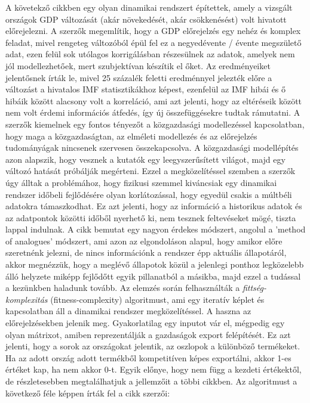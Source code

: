 \documentclass{article}
\theoremstyle{definition}
\theoremstyle{theorem}
\begin{document}
\newline A követekző cikkben \cite{Tacchella} egy olyan dinamikai rendszert építettek, amely a vizsgált országok GDP változását (akár növekedését, akár csökkenésést) volt hivatott előrejelezni. A szerzők megemlítik, hogy a GDP előrejelzés egy nehéz és komplex feladat, mivel rengeteg változóból épül fel ez a negyedévente / évente megszülető adat, ezen felül sok utólagos korrigálásban részesülnek az adatok, amelyek nem jól modellezhetőek, mert szubjektívan készítik el őket. Az eredményeiket jelentősnek írták le, mivel 25 százalék feletti eredménnyel jelezték előre a változást a hivatalos IMF statisztikákhoz képest, ezenfelül az IMF hibái és ő hibáik között alacsony volt a korreláció, ami azt jelenti, hogy az eltéréseik között nem volt érdemi információs átfedés, így új összefüggésekre tudtak rámutatni. A szerzők kiemelnek egy fontos tényezőt a közgazdasági modellezéssel kapcsolatban, hogy maga a közgazdaságtan, az elméleti modellezés és az előrejelzés tudományágak nincsenek szervesen összekapcsolva. A közgazdasági modellépítés azon alapszik, hogy vesznek a kutatók egy leegyszerűsített világot, majd egy változó hatását próbálják megérteni. Ezzel a megközelítéssel szemben a szerzők úgy álltak a problémához, hogy fizikusi szemmel kiváncsiak egy dinamikai rendszer időbeli fejlődésére olyan korlátozással, hogy egyedül csakis a múltbéli adatokra támaszkodhat. Ez azt jelenti, hogy az információ a historikus adatok és az adatpontok közötti időből nyerhető ki, nem tesznek feltevéseket mögé, tiszta lappal indulnak. A cikk bemutat egy nagyon érdekes módszert, angolul a 'method of analogues' módszert, ami azon az elgondoláson alapul, hogy amikor előre szeretnénk jelezni, de nincs információnk a rendszer épp aktuális állapotáról, akkor megnézzük, hogy a meglévő állapotok közül a jelenlegi ponthoz legközelebb álló helyzete miképp fejlődőtt egyik pillanatból a másikba, majd ezzel a tudással a kezünkben haladunk tovább. Az elemzés során felhasználták a \textit{fittség-komplexitás} (fitness-complexity) algoritmust, ami egy iteratív képlet és kapcsolatban áll a dinamikai rendszer megközelítéssel. A haszna az előrejelzésekben jelenik meg. Gyakorlatilag egy inputot vár el, mégpedig egy olyan mátrixot, amiben reprezentálják a gazdaságok export felépítését. Ez azt jelenti, hogy a sorok az országokat jelentik, az oszlopok a különböző termékeket. Ha az adott ország adott termékből kompetitíven képes exportálni, akkor 1-es értéket kap, ha nem akkor 0-t. Egyik előnye, hogy nem függ a kezdeti értékektől, de részletesebben megtalálhatjuk a jellemzőit a többi cikkben. Az algoritmust a következő féle képpen írták fel a cikk szerzői:
\end{document}
